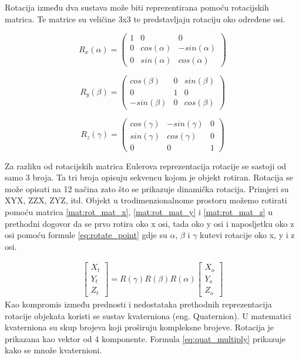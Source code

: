 Rotacija između dva sustava može biti reprezentirana pomoću rotacijskih matrica\cite{wiki:Rotation_matrix}. Te matrice su veličine 3x3 te predstavljaju rotaciju oko određene osi.

\begin{equation}
  R_{x}(\alpha) =
  \begin{pmatrix}
    1 & 0 & 0\\
    0 & cos(\alpha) & -sin(\alpha)\\
    0 & sin(\alpha) & cos(\alpha)
  \end{pmatrix}
  \label{mat:rot_mat_x}
\end{equation}

\begin{equation}
  R_{y}(\beta) =
  \begin{pmatrix}
    cos(\beta) & 0 & sin(\beta)\\
    0 & 1 & 0\\
    -sin(\beta) & 0 & cos(\beta)
  \end{pmatrix}
  \label{mat:rot_mat_y}
\end{equation}

\begin{equation}
  R_{z}(\gamma) =
  \begin{pmatrix}
    cos(\gamma) & -sin(\gamma) & 0\\
    sin(\gamma) & cos(\gamma) & 0\\
    0 & 0 & 1
  \end{pmatrix}
  \label{mat:rot_mat_z}
\end{equation}

Za razliku od rotacijskih matrica Eulerova reprezentacija rotacije se sastoji od samo 3 broja. Ta tri broja opisuju sekvencu kojom je objekt rotiran. Rotacija se može opisati na 12 načina zato što se prikazuje dinamička rotacija. Primjeri su XYX, ZZX, ZYZ, itd. Objekt u trodimenzionalnome prostoru možemo rotirati pomoću matrica \ref{mat:rot_mat_x}, \ref{mat:rot_mat_y} i \ref{mat:rot_mat_z} u prethodni dogovor da se prvo rotira oko x osi, tada oko y osi i naposljetku oko z osi pomoću formule \ref{eq:rotate_point} gdje su $\alpha$, $\beta$ i $\gamma$ kutevi rotacije oko x, y i z osi.

\begin{gather}
    \begin{bmatrix} X_{t}\\ Y_{t}\\ Z_{t} \end{bmatrix}
    =
    R(\gamma)R(\beta)R(\alpha)
    \begin{bmatrix} X_{o}\\ Y_{o}\\ Z_{o} \end{bmatrix}
    \label{eq:rotate_point}
\end{gather}
Kao kompromis između prednosti i nedostataka prethodnih reprezentacija rotacije objekata koristi se sustav kvaterniona\cite{wiki:Quaternion} (eng. Quaternion). U matematici kvaterniona su skup brojeva koji proširuju kompleksne brojeve. Rotacija je prikazana kao vektor od 4 komponente. Formula \ref{eq:quat_multiply} prikazuje kako se množe kvaternioni.

